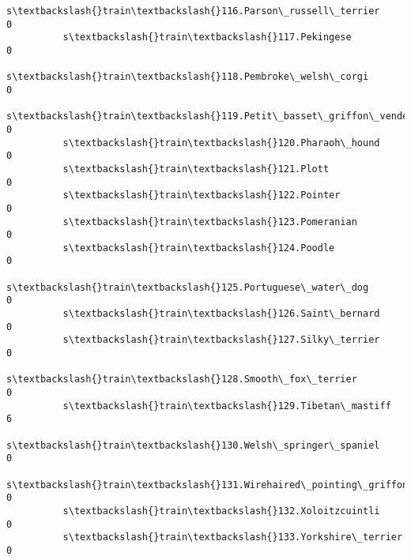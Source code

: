 \documentclass[11pt]{article}
\begin{document}
\begin{Verbatim}[commandchars=\\\{\}]
          s\textbackslash{}train\textbackslash{}116.Parson\_russell\_terrier                                        0   
          s\textbackslash{}train\textbackslash{}117.Pekingese                                                     0   
          s\textbackslash{}train\textbackslash{}118.Pembroke\_welsh\_corgi                                          0   
          s\textbackslash{}train\textbackslash{}119.Petit\_basset\_griffon\_vendeen                                  0   
          s\textbackslash{}train\textbackslash{}120.Pharaoh\_hound                                                 0   
          s\textbackslash{}train\textbackslash{}121.Plott                                                         0   
          s\textbackslash{}train\textbackslash{}122.Pointer                                                       0   
          s\textbackslash{}train\textbackslash{}123.Pomeranian                                                    0   
          s\textbackslash{}train\textbackslash{}124.Poodle                                                        0   
          s\textbackslash{}train\textbackslash{}125.Portuguese\_water\_dog                                          0   
          s\textbackslash{}train\textbackslash{}126.Saint\_bernard                                                 0   
          s\textbackslash{}train\textbackslash{}127.Silky\_terrier                                                 0   
          s\textbackslash{}train\textbackslash{}128.Smooth\_fox\_terrier                                            0   
          s\textbackslash{}train\textbackslash{}129.Tibetan\_mastiff                                               6   
          s\textbackslash{}train\textbackslash{}130.Welsh\_springer\_spaniel                                        0   
          s\textbackslash{}train\textbackslash{}131.Wirehaired\_pointing\_griffon                                   0   
          s\textbackslash{}train\textbackslash{}132.Xoloitzcuintli                                                0   
          s\textbackslash{}train\textbackslash{}133.Yorkshire\_terrier                                             0   
          

\end{Verbatim}
\end{document}
